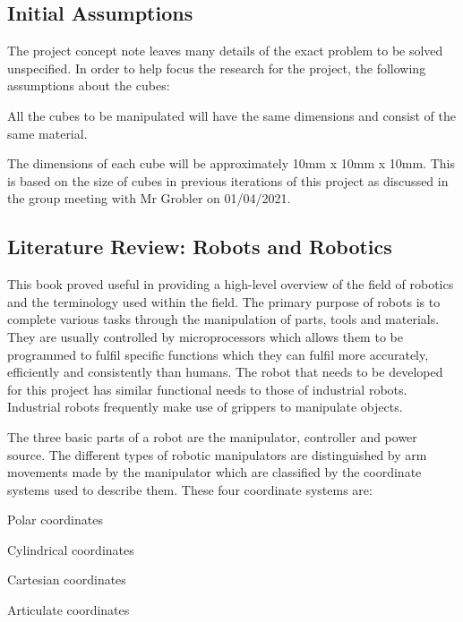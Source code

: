\subsection{Initial Assumptions}

The project concept note leaves many details of the exact problem to be solved unspecified. In order to help focus the research for the project, the following assumptions about the cubes:

\begin{compactitem}
    \item All the cubes to be manipulated will have the same dimensions and consist of the same material.
    \item The dimensions of each cube will be approximately 10mm x 10mm x 10mm. This is based on the size of cubes in previous iterations of this project as discussed in the group meeting with Mr Grobler on 01/04/2021.
\end{compactitem}

\subsection{Literature Review: Robots and Robotics \cite{miller_miller_2017}}

This book proved useful in providing a high-level overview of the field of robotics and the terminology used within the field. The primary purpose of robots is to complete various tasks through the manipulation of parts, tools and materials. They are usually controlled by microprocessors which allows them to be programmed to fulfil specific functions which they can fulfil more accurately, efficiently and consistently than humans. The robot that needs to be developed for this project has similar functional needs to those of industrial robots. Industrial robots frequently make use of grippers to manipulate objects.

The three basic parts of a robot are the manipulator, controller and power source. The different types of robotic manipulators are distinguished by arm movements made by the manipulator which are classified by the coordinate systems used to describe them. These four coordinate systems are:

\begin{compactitem}
    \item Polar coordinates
    \item Cylindrical coordinates
    \item Cartesian coordinates
    \item Articulate coordinates
\end{compactitem}

